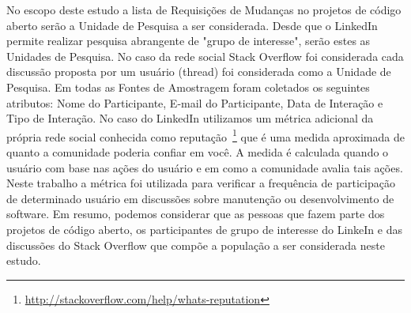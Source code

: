 \begin{table}[htb]
\centering
{}
\caption{Fontes de Amostragem utilizadas no estudo.}
\label{tb:fonte-de-amostragens}
\end{table}

No escopo deste estudo a lista de Requisições de Mudanças no projetos de código
aberto serão a Unidade de Pesquisa a ser considerada. Desde que o LinkedIn
permite realizar pesquisa abrangente de "grupo de interesse", serão estes as
Unidades de Pesquisa. No caso da rede social Stack Overflow foi considerada cada
discussão proposta por um usuário (thread) foi considerada como a Unidade de
Pesquisa. Em todas as Fontes de Amostragem foram coletados os seguintes
atributos: Nome do Participante, E-mail do Participante, Data de Interação e
Tipo de Interação. No caso do LinkedIn utilizamos um métrica
adicional da própria rede social conhecida como
reputação~\footnote{\url{http://stackoverflow.com/help/whats-reputation}} que é
uma medida aproximada de quanto a comunidade poderia confiar em você. A medida é
calculada quando o usuário com base nas ações do usuário e em como a comunidade
avalia tais ações. Neste trabalho a métrica foi utilizada para verificar a
frequência de participação de determinado usuário em discussões sobre manutenção
ou desenvolvimento de software. Em resumo, podemos considerar que as pessoas que
fazem parte dos projetos de código aberto, os participantes de grupo de
interesse do LinkeIn e das discussões do Stack Overflow  que compõe a população
a ser considerada neste estudo.

